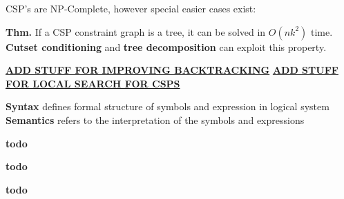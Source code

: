 \documentclass[a4paper,10pt,twocolumn]{article}
\begin{document}
\begin{tcolorbox}[title=Constraint Satisfaction, module]
    \vspace{0.5em}

    CSP's are NP-Complete, however special easier cases exist:
    
    \textbf{Thm. } If a CSP constraint graph is a tree, it can be solved in $O(n k^2)$ time.
    \textbf{Cutset conditioning} and \textbf{tree decomposition} can exploit this property.

    \underline{\textbf{ADD STUFF FOR IMPROVING BACKTRACKING}}
    \underline{\textbf{ADD STUFF FOR LOCAL SEARCH FOR CSPS}}

\end{tcolorbox}

\begin{tcolorbox}[title=Logic, module]
    \textbf{Syntax} defines formal structure of symbols and expression in logical system
    \textbf{Semantics} refers to the interpretation of the symbols and expressions
\end{tcolorbox}

\begin{tcolorbox}[title={Probability \& Uncertainty, Bayesian Networks}, module]
    \textbf{todo}
\end{tcolorbox}

\begin{tcolorbox}[title={Intro to ML, Linear Regression, kNN}, module]
    \textbf{todo}
\end{tcolorbox}

\begin{tcolorbox}[title={Decision Trees and Neural Networks}, module]
    \textbf{todo}
\end{tcolorbox}
\end{document}
